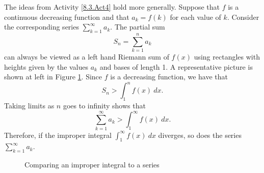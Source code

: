 The ideas from Activity \ref{8.3.Act4} hold more generally.  Suppose that $f$  is a continuous decreasing function and that $a_k = f(k)$ for each value of $k$.  Consider the corresponding series $ \sum_{k=1}^{\infty} a_k$. The partial sum
\[S_n = \sum_{k=1}^{n} a_k\]
can always be viewed as a left hand Riemann sum of $f(x)$ using rectangles with heights given by the values $a_k$ and bases of length 1. A representative picture is shown at left in Figure \ref{F:8.3.Integral_Test}. Since $f$ is a decreasing function, we have that
\[S_n > \int_1^n f(x) \ dx.\]
Taking limits as $n$ goes to infinity shows that
\[\sum_{k=1}^{\infty} a_k > \int_{1}^{\infty} f(x) \ dx.\]
Therefore, if the improper integral $ \int_{1}^{\infty} f(x) \ dx$ diverges, so does the series $ \sum_{k=1}^{\infty} a_k$.
\begin{figure}[h]
\begin{center}
 \hspace{0.25in} 
\caption{Comparing an improper integral to a series}
\label{F:8.3.Integral_Test}
\end{center}
\end{figure}

